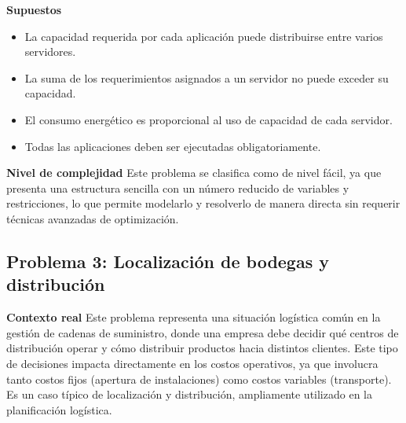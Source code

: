 \documentclass[12pt,a4paper]{article}
\begin{document}
\textbf{Supuestos}
\begin{itemize}[leftmargin=*]
	\item La capacidad requerida por cada aplicación puede distribuirse entre varios servidores.
	\item La suma de los requerimientos asignados a un servidor no puede exceder su capacidad.
	\item El consumo energético es proporcional al uso de capacidad de cada servidor.
	\item Todas las aplicaciones deben ser ejecutadas obligatoriamente.
\end{itemize}

\textbf{Nivel de complejidad} Este problema se clasifica como de nivel fácil, ya que presenta una estructura sencilla con un número reducido de variables y restricciones, lo que permite modelarlo y resolverlo de manera directa sin requerir técnicas avanzadas de optimización.

\subsection{Problema 3: Localización de bodegas y distribución}

\textbf{Contexto real} Este problema representa una situación logística común en la gestión de cadenas de suministro, donde una empresa debe decidir qué centros de distribución operar y cómo distribuir productos hacia distintos clientes. Este tipo de decisiones impacta directamente en los costos operativos, ya que involucra tanto costos fijos (apertura de instalaciones) como costos variables (transporte). Es un caso típico de localización y distribución, ampliamente utilizado en la planificación logística.
\end{document}
